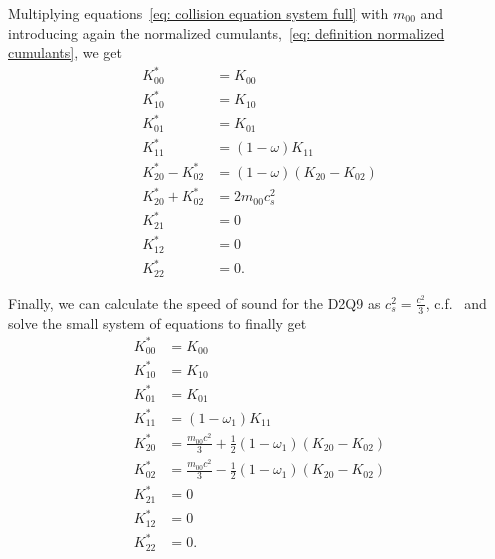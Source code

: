 Multiplying equations~\eqref{eq: collision equation system full} with $m_{00}$ and introducing again the normalized cumulants,~\eqref{eq: definition normalized cumulants}, we get
\begin{equation}
  \label{eq: final collision all relaxations}
  \begin{aligned}
    K_{00}^{*} & = K_{00} \\
    K_{10}^{*} & = K_{10} \\
    K_{01}^{*} & = K_{01} \\
    K_{11}^{*} & = (1-\omega)K_{11} \\
    K_{20}^{*} - K_{02}^{*} & = (1-\omega) (K_{20} - K_{02}) \\
    K_{20}^{*} + K_{02}^{*} & = 2 m_{00} c_s^2 \\
    K_{21}^{*} & = 0 \\
    K_{12}^{*} & = 0 \\
    K_{22}^{*} & = 0.
  \end{aligned}
\end{equation}

Finally, we can calculate the speed of sound for the D2Q9 as $c_s^2=\frac{c^2}{3}$, c.f.~\cite[page 175]{wolf2000lattice} and solve the small system of equations to finally get
\begin{equation}
  \label{eq: final collision one relaxation}
  \begin{aligned}
    K_{00}^{*} & = K_{00} \\
    K_{10}^{*} & = K_{10} \\
    K_{01}^{*} & = K_{01} \\
    K_{11}^{*} & = (1-\omega_1)K_{11} \\
    K_{20}^{*} & = \frac{m_{00}c^2}{3} + \frac{1}{2}(1-\omega_1) (K_{20} - K_{02}) \\
    K_{02}^{*} & = \frac{m_{00}c^2}{3} - \frac{1}{2}(1-\omega_1) (K_{20} - K_{02}) \\
    K_{21}^{*} & = 0 \\
    K_{12}^{*} & = 0 \\
    K_{22}^{*} & = 0.
  \end{aligned}
\end{equation}

